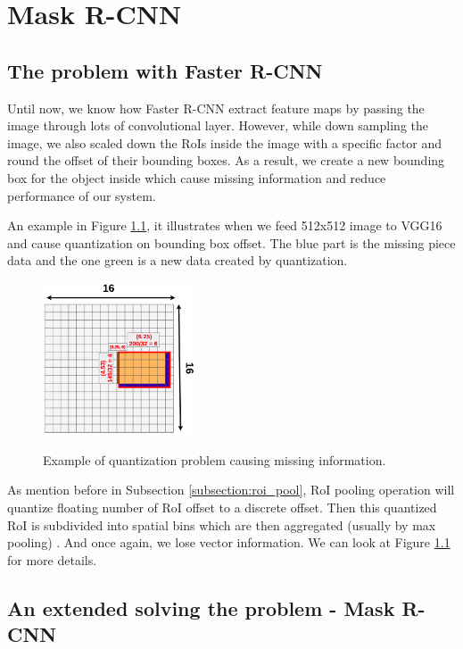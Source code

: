 \chapter{Mask R-CNN}
\noindent

\section{The problem with Faster R-CNN}
\label{section:problemofFasterRCNN}
\noindent

	Until now, we know how Faster R-CNN extract feature maps by passing the image through lots of convolutional layer. However, while down sampling the image, we also scaled down the RoIs inside the image with a specific factor and round the offset of their bounding boxes. As a result, we create a new bounding box for the object inside which cause missing information and reduce performance of our system.
	
	An example in Figure \ref{fig:quantization_problem}, it illustrates when we feed 512x512 image to VGG16 and cause quantization on bounding box offset. The blue part is the missing piece data and the one green is a new data created by quantization.
	
	\begin{figure}[H]
		\centering
		{\includegraphics[width=0.4\textwidth]{./hinhanh/chap5/problem.png}}
		\caption{Example of quantization problem causing missing information.}
		\label{fig:quantization_problem}
	\end{figure}
	
	As mention before in Subsection \ref{subsection:roi_pool}, RoI pooling operation will quantize floating number of RoI offset to a discrete offset. Then this quantized RoI is subdivided into spatial bins which are then aggregated (usually by max pooling) \cite{fasterrcnn}. And once again, we lose vector information. We can look at Figure \ref{fig:quantization_problem} for more details.

\section{An extended solving the problem - Mask R-CNN}
\label{section:maskrcnn}
\noindent

